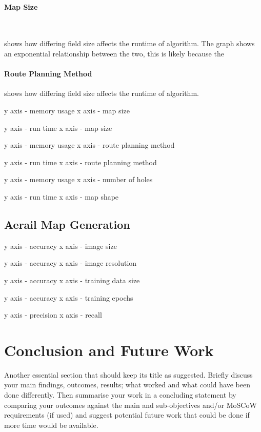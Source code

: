 \documentclass[final]{cmpreport_02}
\begin{document}
\paragraph{Map Size} \

 shows how differing field size affects the runtime of algorithm.
The graph shows an exponential relationship between the two, this is likely because the




\paragraph{Route Planning Method}
 shows how differing field size affects the runtime of algorithm.

y axis - memory usage
x axis - map size


y axis - run time
x axis - map size

y axis - memory usage
x axis - route planning method

y axis - run time
x axis - route planning method

y axis - memory usage
x axis - number of holes

y axis - run time
x axis - map shape

\subsection{Aerail Map Generation}

y axis - accuracy
x axis - image size

y axis - accuracy
x axis - image resolution

y axis - accuracy
x axis - training data size

y axis - accuracy
x axis - training epochs

y axis - precision
x axis - recall
\section{Conclusion and Future Work}


Another essential section that should keep its title as suggested. Briefly discuss your main findings, outcomes, results; what worked and what could have been done differently. Then summarise your work in a concluding statement by comparing your outcomes against the main and sub-objectives and/or MoSCoW requirements (if used) and suggest potential future work that could be done if more time would be available.
\end{document}

